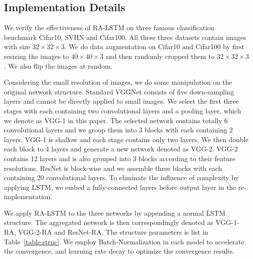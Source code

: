 \documentclass[runningheads]{llncs}
\begin{document}
\subsection{Implementation Details}

We verify the effectiveness of RA-LSTM on three famous classification benchmark Cifar10\cite{cifar}, SVHN\cite{SVHN} and Cifar100\cite{cifar}. All these three datasets contain images with size $32\times 32\times 3$. We do data augmentation on Cifar10 and Cifar100 by first resizing the images to $40\times 40\times 3$ and then randomly cropped them to $32\times 32\times 3$. We also flip the images at random.

Considering the small resolution of images, we do some manipulation on the original network structure. Standard VGGNet consists of five down-sampling layers and cannot be directly applied to small images. We select the first three stages with each containing two convolutional layers and a pooling layer, which we denote as VGG-1 in this paper. The selected network contains totally 6 convolutional layers and we group them into 3 blocks with each containing 2 layers. VGG-1 is shallow and each stage contains only two layers. We then double each block to 4 layers and generate a new network denoted as VGG-2. VGG-2 contains 12 layers and is also grouped into 3 blocks according to their feature resolutions. ResNet is block-wise and we assemble three blocks with each containing 20 convolutional layers. To eliminate the influence of complexity by applying LSTM, we embed a fully-connected layers before output layer in the re-implementation.

We apply RA-LSTM to the three networks by appending a normal LSTM structure. The aggregated network is then correspondingly denoted as VGG-1-RA, VGG-2-RA and ResNet-RA. The structure parameters is list in Table~\ref{table:struc}. We employ Batch-Normalization in each model to accelerate the convergence, and learning rate decay to optimize the convergence results.
\end{document}
